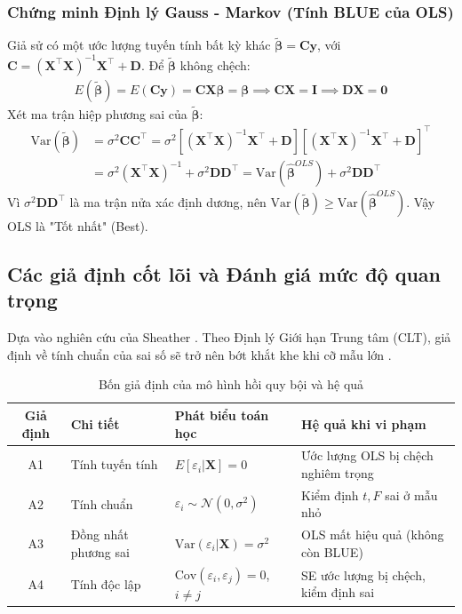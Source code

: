 	\subsubsection{Chứng minh Định lý Gauss - Markov (Tính BLUE của OLS)}
	Giả sử có một ước lượng tuyến tính bất kỳ khác $\tilde{\boldsymbol{\beta}} = \mathbf{C}\mathbf{y}$, với $\mathbf{C} = (\mathbf{X}^{\top}\mathbf{X})^{-1}\mathbf{X}^{\top} + \mathbf{D}$. 
	Để $\tilde{\boldsymbol{\beta}}$ không chệch:
	\begin{align}
		E(\tilde{\boldsymbol{\beta}}) = E(\mathbf{C}\mathbf{y}) = \mathbf{C}\mathbf{X}\boldsymbol{\beta} = \boldsymbol{\beta} \implies \mathbf{C}\mathbf{X} = \mathbf{I} \implies \mathbf{D}\mathbf{X} = \mathbf{0}
	\end{align}
	Xét ma trận hiệp phương sai của $\tilde{\boldsymbol{\beta}}$:
	\begin{align}
		\text{Var}(\tilde{\boldsymbol{\beta}}) &= \sigma^2 \mathbf{C}\mathbf{C}^{\top} = \sigma^2 \left[(\mathbf{X}^{\top}\mathbf{X})^{-1}\mathbf{X}^{\top} + \mathbf{D}\right] \left[(\mathbf{X}^{\top}\mathbf{X})^{-1}\mathbf{X}^{\top} + \mathbf{D}\right]^{\top} \nonumber\\
		&= \sigma^2(\mathbf{X}^{\top}\mathbf{X})^{-1} + \sigma^2\mathbf{D}\mathbf{D}^{\top} = \text{Var}(\hat{\boldsymbol{\beta}}^{OLS}) + \sigma^2\mathbf{D}\mathbf{D}^{\top}
	\end{align}
	Vì $\sigma^2\mathbf{D}\mathbf{D}^{\top}$ là ma trận nửa xác định dương, nên $\text{Var}(\tilde{\boldsymbol{\beta}}) \geq \text{Var}(\hat{\boldsymbol{\beta}}^{OLS})$. Vậy OLS là "Tốt nhất" (Best).
	
	\subsection{Các giả định cốt lõi và Đánh giá mức độ quan trọng}
	Dựa vào nghiên cứu của Sheather \cite{sheather2009}. Theo Định lý Giới hạn Trung tâm (CLT), giả định về tính chuẩn của sai số sẽ trở nên bớt khắt khe khi cỡ mẫu lớn \cite{wooldridge2015}.
	\begin{table}[H]
		\centering
		\caption{Bốn giả định của mô hình hồi quy bội và hệ quả}
		\renewcommand{\arraystretch}{1.4}
		\begin{tabular}{clp{5.5cm}p{4.5cm}}
			\toprule
			\textbf{Giả định} & \textbf{Chi tiết} & \textbf{Phát biểu toán học} & \textbf{Hệ quả khi vi phạm} \\
			\midrule
			A1 & Tính tuyến tính & $E[\varepsilon_i | \mathbf{X}] = 0$ & Ước lượng OLS bị chệch nghiêm trọng \\
			A2 & Tính chuẩn & $\varepsilon_i \sim \mathcal{N}(0, \sigma^2)$ & Kiểm định $t, F$ sai ở mẫu nhỏ \\
			A3 & Đồng nhất phương sai & $\text{Var}(\varepsilon_i | \mathbf{X}) = \sigma^2$ & OLS mất hiệu quả (không còn BLUE) \\
			A4 & Tính độc lập & $\text{Cov}(\varepsilon_i, \varepsilon_j) = 0$, $i \neq j$ & SE ước lượng bị chệch, kiểm định sai \\
			\bottomrule
		\end{tabular}
	\end{table}
